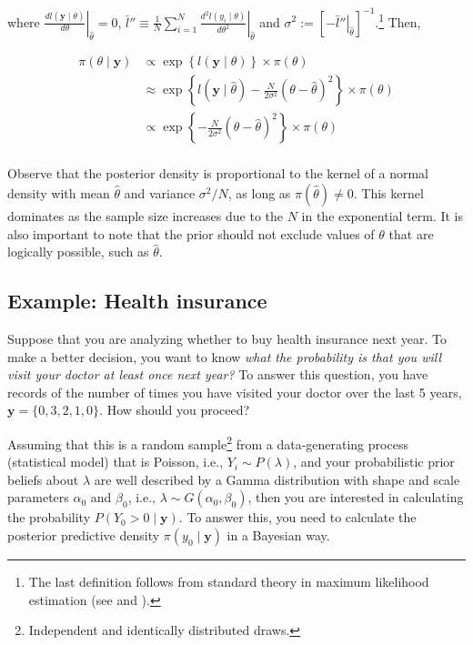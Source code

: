 where $\left.\frac{dl(\mathbf{y}\mid \theta)}{d\theta}\right\vert_{\hat{\theta}}=0$, $\bar{l}''\equiv\frac{1}{N}\left.\sum_{i=1}^N\frac{d^2l(y_i\mid {\theta})}{d\theta^2}\right\vert_{\hat{\theta}}$ and $\sigma^2:=\left[\left.-\bar{l}''\right\vert_{\hat{\theta}}\right]^{-1}$.\footnote{The last definition follows from standard theory in maximum likelihood estimation (see \cite[Chap. ~10]{casella2024statistical} and \cite[Chap. ~13]{wooldridge2010econometric}).} Then,

\begin{align*}
	\pi(\theta\mid \mathbf{y})&\propto \exp\left\{{l}(\mathbf{y}\mid \theta)\right\} \times \pi(\theta)\\
	&\approx \exp\left\{l(\mathbf{y}\mid \hat{\theta})-\frac{N}{2\sigma^2}(\theta-\hat{\theta})^2\right\} \times \pi(\theta)\\
	&\propto \exp\left\{-\frac{N}{2\sigma^2}(\theta-\hat{\theta})^2\right\} \times \pi(\theta)\\ 
\end{align*}

Observe that the posterior density is proportional to the kernel of a normal density with mean $\hat{\theta}$ and variance $\sigma^2 / N$, as long as $\pi(\hat{\theta}) \neq 0$. This kernel dominates as the sample size increases due to the $N$ in the exponential term. It is also important to note that the prior should not exclude values of $\theta$ that are logically possible, such as $\hat{\theta}$.

\subsection{Example: Health insurance}\label{sec121}
Suppose that you are analyzing whether to buy health insurance next year. To make a better decision, you want to know \textit{what the probability is that you will visit your doctor at least once next year?} To answer this question, you have records of the number of times you have visited your doctor over the last 5 years, \( \mathbf{y} = \{0, 3, 2, 1, 0\} \). How should you proceed?

Assuming that this is a random sample\footnote{Independent and identically distributed draws.} from a data-generating process (statistical model) that is Poisson, i.e., \( Y_i \sim P(\lambda) \), and your probabilistic prior beliefs about \( \lambda \) are well described by a Gamma distribution with shape and scale parameters \( \alpha_0 \) and \( \beta_0 \), i.e., \( \lambda \sim G(\alpha_0, \beta_0) \), then you are interested in calculating the probability \( P(Y_0 > 0 \mid \mathbf{y}) \). To answer this, you need to calculate the posterior predictive density \( \pi(y_0 \mid \mathbf{y}) \) in a Bayesian way.

